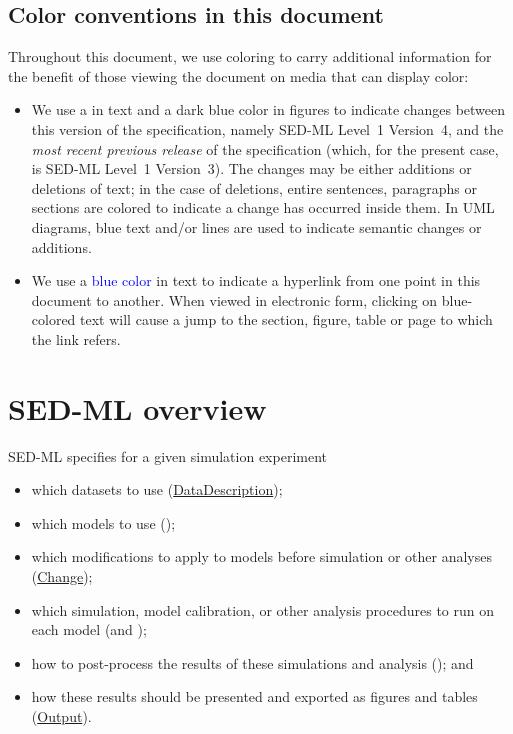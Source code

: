 \subsection{Color conventions in this document}
\label{sec:notation}

Throughout this document, we use coloring to carry additional
information for the benefit of those viewing the document on media
that can display color:

\begin{itemize}

\item We use a  in text and a \textcolor[rgb]{0.0117, 0.0664, 0.5742}{dark blue color} in figures to indicate changes
  between this version of the specification, namely SED-ML Level~1 Version~4, and
  the \emph{most recent previous release} of the specification
  (which, for the present case, is SED-ML Level~1 Version~3).  The changes may be either
  additions or deletions of text; in the case of deletions, entire
  sentences, paragraphs or sections are colored to indicate a
  change has occurred inside them.  In UML diagrams, blue text and/or lines are used to indicate semantic changes or additions.

\item We use a \textcolor{blue}{blue color} in text to indicate a hyperlink from one
  point in this document to another.  When viewed in electronic form, clicking
  on blue-colored text will cause a jump to the
  section, figure, table or page to which the link refers.

\end{itemize}




\section{SED-ML overview}
SED-ML specifies for a given simulation experiment

\begin{itemize}
\item which datasets to use (\hyperref[class:dataDescription]{DataDescription});
\item which models to use (\Model);
\item which modifications to apply to models before simulation or other analyses (\hyperref[class:change]{Change});
\item which simulation, model calibration, or other analysis procedures to run on each model (\Simulation and \AbstractTask);
\item how to post-process the results of these simulations and analysis (\DataGenerator); and
\item how these results should be presented and exported as figures and tables (\hyperref[class:output]{Output}).
\end{itemize}


